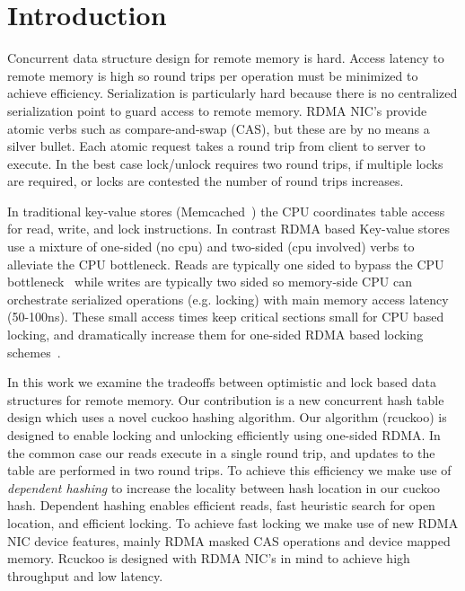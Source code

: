 \section{Introduction}
\label{sec:intro}

Concurrent data structure design for remote memory is hard.
Access latency to remote memory is high so round trips per
operation must be minimized to achieve efficiency.
Serialization is particularly hard because there is no
centralized serialization point to guard access to remote
memory. RDMA NIC's provide atomic verbs such as
compare-and-swap (CAS), but these are by no means a silver
bullet.  Each atomic request takes a round trip from client
to server to execute. In the best case lock/unlock requires
two round trips, if multiple locks are required, or locks
are contested the number of round trips increases.

In traditional key-value stores (Memcached~\cite{memcached})
the CPU coordinates table access for read, write, and lock
instructions. In contrast RDMA based Key-value
stores~\cite{herd,erpc,pilaf} use a mixture of one-sided (no
cpu) and two-sided (cpu involved) verbs to alleviate the CPU
bottleneck. Reads are typically one sided to bypass the CPU
bottleneck~\cite{pilaf,cell} while writes are typically two
sided so memory-side CPU can orchestrate serialized
operations (e.g. locking) with main memory access latency
(50-100ns).  These small access times keep critical sections
small for CPU based locking, and dramatically increase them
for one-sided RDMA based locking schemes~\cite{clover,
sherman}.

In this work we examine the tradeoffs between optimistic and
lock based data structures for remote memory. Our
contribution is a new concurrent hash table design which
uses a novel cuckoo hashing algorithm. Our algorithm
(rcuckoo) is designed to enable locking and unlocking
efficiently using one-sided RDMA. In the common case our
reads execute in a single round trip, and updates to the
table are performed in two round trips. To achieve this
efficiency we make use of \textit{dependent hashing} to
increase the locality between hash location in our cuckoo
hash. Dependent hashing enables efficient reads, fast
heuristic search for open location, and efficient locking.
To achieve fast locking we make use of new RDMA NIC device
features, mainly RDMA masked CAS operations and device
mapped memory. Rcuckoo is designed with RDMA NIC's in mind
to achieve high throughput and low latency.

